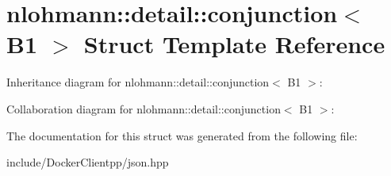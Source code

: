 \hypertarget{structnlohmann_1_1detail_1_1conjunction_3_01B1_01_4}{}\section{nlohmann\+::detail\+::conjunction$<$ B1 $>$ Struct Template Reference}
\label{structnlohmann_1_1detail_1_1conjunction_3_01B1_01_4}


Inheritance diagram for nlohmann\+::detail\+::conjunction$<$ B1 $>$\+:


Collaboration diagram for nlohmann\+::detail\+::conjunction$<$ B1 $>$\+:


The documentation for this struct was generated from the following file\+:\begin{DoxyCompactItemize}
\item 
include/\+Docker\+Clientpp/json.\+hpp\end{DoxyCompactItemize}

